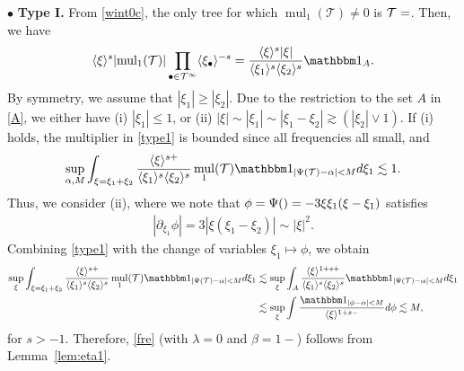 \documentclass[a4paper,
11pt,  reqno]{amsart}
\makeatletter
\newcommand{\jap}[1]{\langle #1 \rangle}
\newcommand{\5}{\textup{V}}
\newcommand{\noi}{\noindent}
\newcommand{\ind}{\mathbbm 1}
\newcommand{\les}{\lesssim}
\theoremstyle{remark}
\newcommand{\bul}{\bullet}
\newcommand{\TT}{\mathcal{T}}
\newcommand{\al}{\alpha}
\newcommand{\ges}{\gtrsim}
\newcommand{\jb}[1]
{\langle #1 \rangle}
\DeclareMathOperator{\mul}{mul}
\def\<#1>{\csname MH@symb@#1\endcsname}
\numberwithin{equation}{section}
\numberwithin{theorem}{section}
\makeatother
\begin{document}
\smallskip 
\noi
$\bul$ \textbf{Type I.} 
From \eqref{wint0c}, the only tree for which $\mul_1(\TT)\neq 0$ is $\TT=\<1>$. Then, we have 
\begin{align}\label{type1}
\jap{\xi}^s
| {\mul}_1(\TT) | 
\prod_{\bul\in \TT^\infty} \jap{\xi_\bul}^{-s}
= 
\frac{\jap{\xi}^s |\xi|}{\jap{\xi_1}^s \jap{\xi_2}^s} \ind_{A}.
\end{align}
By symmetry, we assume that $|\xi_1| \ge |\xi_2|$.
Due to the restriction to the set $A$ in \eqref{A}, we either have (i) $|\xi_1| \le 1$, or (ii) $|\xi| \sim |\xi_1| \sim | \xi_1 - \xi_2 | \ges (|\xi_2| \lor 1)$. 
If (i) holds, the multiplier in \eqref{type1} is bounded since all frequencies all small, and 
$$
\sup_{\al, M} 
\int_{\xi=\xi_1+\xi_2}\frac{ \jb{\xi}^{s+ } }{\jb{\xi_1}^s \jb{\xi_2}^s } \mul_{1} (\TT) \ind_{|\Psi(\TT) - \al| < M }d\xi_1 \lesssim 1.
$$
Thus, we consider (ii), where we note that $\phi = \Psi(\<1>) = -3 \xi \xi_1(\xi-\xi_1)$ satisfies
\begin{align}
| \partial_{\xi_1} \phi | = 3 | \xi (\xi_1 - \xi_2)| \sim |\xi|^2.
\end{align}
Combining \eqref{type1} with the change of variables $\xi_1 \mapsto \phi $, we obtain
	\begin{align*}
    \sup_\xi
\int_{\xi=\xi_1+\xi_2} 
\frac{ \jb{\xi}^{s+ } }{\jb{\xi_1}^s \jb{\xi_2}^s } \mul_{1} (\TT) \ind_{|\Psi(\TT) - \al| < M }d\xi_1
 &
\les 
\sup_\xi
\int_{A} \frac{\jap{\xi}^{1 + s + }}{\jap{\xi_{1}}^{s}\jap{\xi_{2}}^{s}} \ind_{|\Psi(\TT) - \al| < M } d\xi_{1} 
\\&\les 
\sup_\xi
 \int \frac{\ind_{|\phi-\al| < M} }{ \jap{\xi}^{1 + s- }} d\phi \lesssim M, 
	\end{align*}
	for $s>-1$. Therefore, \eqref{fre} (with $\lambda=0$ and $\beta=1-$) follows from Lemma~\ref{lem:eta1}.
    
\end{document}
